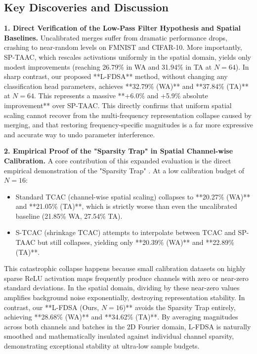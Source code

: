 \documentclass{article}
\begin{document}
\subsection{Key Discoveries and Discussion}

\textbf{1. Direct Verification of the Low-Pass Filter Hypothesis and Spatial Baselines.}
Uncalibrated merges suffer from dramatic performance drops, crashing to near-random levels on FMNIST and CIFAR-10. More importantly, SP-TAAC, which rescales activations uniformly in the spatial domain, yields only modest improvements (reaching 26.79\% in WA and 31.94\% in TA at $N=64$). 
In sharp contrast, our proposed **L-FDSA** method, without changing any classification head parameters, achieves **32.79\% (WA)** and **37.84\% (TA)** at $N=64$. This represents a massive **+6.0\% and +5.9\% absolute improvement** over SP-TAAC. This directly confirms that uniform spatial scaling cannot recover from the multi-frequency representation collapse caused by merging, and that restoring frequency-specific magnitudes is a far more expressive and accurate way to undo parameter interference.

\textbf{2. Empirical Proof of the "Sparsity Trap" in Spatial Channel-wise Calibration.}
A core contribution of this expanded evaluation is the direct empirical demonstration of the "Sparsity Trap" \citep{submission3}. At a low calibration budget of $N=16$:
\begin{itemize}
    \item Standard TCAC (channel-wise spatial scaling) collapses to **20.27\% (WA)** and **21.05\% (TA)**, which is strictly worse than even the uncalibrated baseline (21.85\% WA, 27.54\% TA).
    \item S-TCAC (shrinkage TCAC) attempts to interpolate between TCAC and SP-TAAC but still collapses, yielding only **20.39\% (WA)** and **22.89\% (TA)**.
\end{itemize}
This catastrophic collapse happens because small calibration datasets on highly sparse ReLU activation maps frequently produce channels with zero or near-zero standard deviations. In the spatial domain, dividing by these near-zero values amplifies background noise exponentially, destroying representation stability. In contrast, our **L-FDSA (Ours, $N=16$)** avoids the Sparsity Trap entirely, achieving **28.68\% (WA)** and **34.62\% (TA)**. By averaging magnitudes across both channels and batches in the 2D Fourier domain, L-FDSA is naturally smoothed and mathematically insulated against individual channel sparsity, demonstrating exceptional stability at ultra-low sample budgets.
\end{document}
